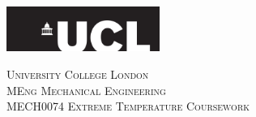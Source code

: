 \begin{titlepage}

  \newcommand{\HRule}{\rule{\linewidth}{0.5mm}} %

  \center
  \includegraphics[width=5cm]{Title/UCL.png}\\[1cm] %


  \center %


  \textsc{\LARGE University College London }\\[1.5cm] %
  \textsc{\Large MEng Mechanical Engineering  }\\[0.5cm] %
  \textsc{\large MECH0074 Extreme Temperature Coursework }\\[1.5cm] %

  \makeatletter
  { \huge \textsc \@title}\\[1.5cm] %




\end{titlepage}
